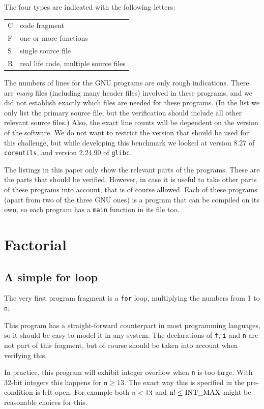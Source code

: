 \documentclass{article}
\begin{document}
The four types are indicated with the following letters:
\begin{center}
\begin{tabular}{ll}
C & code fragment \\
F & one or more functions \\
S & single source file \\
R & real life code, multiple source files
\end{tabular}
\end{center}
The numbers of lines for the GNU programs are only rough indications.
There are \emph{many} files (including many header files) involved in these
programs, and we did not establish exactly which files are needed for
these programs.
(In the list we only list the primary source file, but the verification should
include all other relevant source files.)
Also, the exact line counts will be dependent on the version of the
software.
We do not want to restrict the version that should be used for this
challenge, but while developing this benchmark we looked at version
8.27 of \texttt{coreutils}, and version 2.24.90 of \texttt{glibc}.

The listings in this paper only show the relevant parts of the programs.
These are the parts that should be verified.
However, in case it is useful to take other parts of these programs into
account, that is of course allowed.
Each of these programs (apart from two of the three GNU ones) is a program that can be compiled on its own,
so each program has a \texttt{main} function in its file too.

\section{Factorial}

\subsection{A simple for loop}
The very first program fragment is a \texttt{for} loop,
multiplying the numbers from 1 to \texttt{n}:

This program has a straight-forward counterpart in most
programming languages, so it should be easy to model it in any
system.
The declarations of \texttt{f}, \texttt{i} and \texttt{n} are not part of this
fragment, but of course should be taken into account when verifying this.

In practice, this program will exhibit integer overflow when \texttt{n} is too large.
With 32-bit integers this happens for $\texttt{n}\ge 13$.
The exact way this is specified in the pre-condition is left open.
For example both $\mbox{\lstinline{n}} < 13$ and $\mbox{\lstinline{n}}! \le \mbox{\lstinline{INT_MAX}}$
might be reasonable choices for this.
\end{document}
